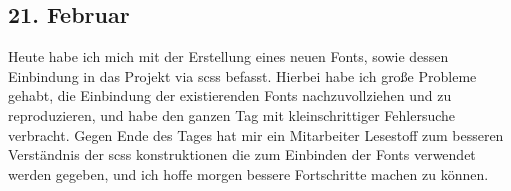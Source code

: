 \subsection{21. Februar}
Heute habe ich mich mit der Erstellung eines neuen Fonts, sowie dessen Einbindung in das Projekt via scss befasst. Hierbei habe ich große Probleme gehabt, die Einbindung der existierenden Fonts nachzuvollziehen und zu reproduzieren, und habe den ganzen Tag mit kleinschrittiger Fehlersuche verbracht. Gegen Ende des Tages hat mir ein Mitarbeiter Lesestoff zum besseren Verständnis der scss konstruktionen die zum Einbinden der Fonts verwendet werden gegeben, und ich hoffe morgen bessere Fortschritte machen zu können.